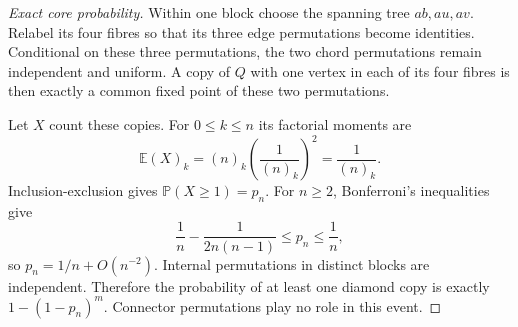 \documentclass[11pt]{article}
\newcommand{\Prb}{\mathbb P}
\begin{document}
\begin{proof}[Exact core probability]
Within one block choose the spanning tree $ab,au,av$. Relabel its four
fibres so that its three edge permutations become identities. Conditional
on these three permutations, the two chord permutations remain independent
and uniform. A copy of $Q$ with one vertex in each of its four fibres is
then exactly a common fixed point of these two permutations.

Let $X$ count these copies. For $0\leq k\leq n$ its factorial moments are
\[
 \mathbb E(X)_k=(n)_k\left(\frac1{(n)_k}\right)^2
              =\frac1{(n)_k}.
 \tag{10}
\]
Inclusion-exclusion gives $\Prb(X\geq1)=p_n$. For $n\geq2$,
Bonferroni's inequalities give
\[
 \frac1n-\frac1{2n(n-1)}\leq p_n\leq\frac1n,
 \tag{11}
\]
so $p_n=1/n+O(n^{-2})$. Internal permutations in distinct blocks are
independent. Therefore the probability of at least one diamond copy is
exactly $1-(1-p_n)^m$. Connector permutations play no role in this event.
\end{proof}
\end{document}
